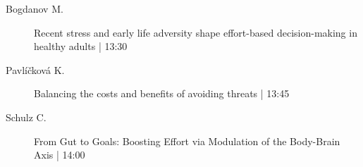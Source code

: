 \begin{symposium}
\begin{description}
                \item [ Bogdanov M.] Recent stress and early life adversity shape effort-based decision-making in healthy adults \textcolor{mygray}{ | 13:30}    
                
                \item [ Pavlíčková K.] Balancing the costs and benefits of avoiding threats \textcolor{mygray}{ | 13:45}    
                
                \item [ Schulz C.] From Gut to Goals: Boosting Effort via Modulation of the Body-Brain Axis \textcolor{mygray}{ | 14:00}    
                
            \end{description} 
            \end{symposium}
            